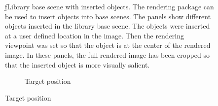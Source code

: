 \documentclass{jov}
\begin{document}
\begin{figure}
\begin{subfigure}[b]{0.14 \textwidth}
        \label{fig:libraryWithChampagneBottle}
    \end{subfigure}
\caption{{\b fLibrary base scene with inserted objects.} The rendering package can be used to insert objects into base scenes. The panels show different objects inserted in the library base scene. The objects were inserted at a user defined location in the image. Then the rendering viewpoint was set so that the object is at the center of the rendered image. In these panels, the full rendered image has been cropped so that the inserted object is more visually salient.}\label{fig:libraryWithTarget}
\end{figure}

\begin{figure}
	\begin{subfigure}[b]{0.18 \textwidth}
    \centering
        \caption{Target position}

\end{subfigure}
\end{figure}
\end{document}
